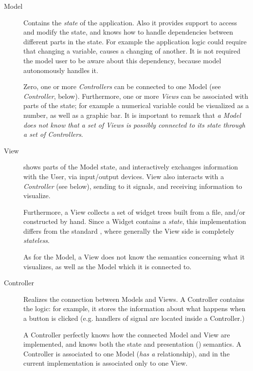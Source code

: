 \begin{description}
\item[Model] Contains the \emph{state} of the application. Also it
  provides support to access and modify the state, and knows how to
  handle dependencies between different parts in the state. For
  example the application logic could require that changing a
  variable, causes a changing of another. It is not required the
  model user to be aware about this dependency, because model
  autonomously handles it.

  Zero, one or more \emph{Controllers} can be connected to one Model
  (see \emph{Controller}, below). Furthermore, one or more
  \emph{Views} can be associated with parts of the state; for example
  a numerical variable could be visualized as a number, as well as a
  graphic bar. It is important to remark that \emph{a Model does not
    know that a set of Views is possibly connected to its state
    through a set of Controllers}.

\item[View] shows parts of the Model state, and interactively
  exchanges information with the User, via input/output devices.  View
  also interacts with a \emph{Controller} (see below), sending to it
  signals, and receiving information to visualize.

  Furthermore, a View collects a set of widget trees built from a
  \glade file, and/or constructed by hand. Since a Widget contains a
  \emph{state}, this implementation differs from the standard \mvc,
  where generally the View side is completely \emph{stateless}.

  As for the Model, a View does not know the semantics concerning what
  it visualizes, as well as the Model which it is connected to.

\item[Controller] Realizes the connection between Models and Views.
  A Controller contains the \gui logic: for example, it stores the
  information about what happens when a button is clicked (e.g. 
  handlers of signal are located inside a Controller.)

  A Controller perfectly knows how the connected Model and View are
  implemented, and knows both the state and presentation (\gui)
  semantics. A Controller is associated to one Model (\emph{has a}
  relationship), and in the current implementation is associated only
  to one View.

\end{description}


